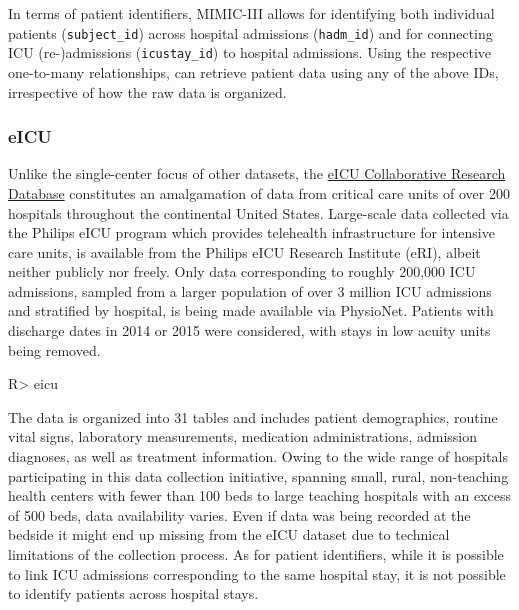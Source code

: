 \documentclass[
]{jss}
\begin{document}
In terms of patient identifiers, MIMIC-III allows for identifying both
individual patients (\texttt{subject\_id}) across hospital admissions
(\texttt{hadm\_id}) and for connecting ICU (re-)admissions
(\texttt{icustay\_id}) to hospital admissions. Using the respective
one-to-many relationships,  can retrieve patient data using
any of the above IDs, irrespective of how the raw data is organized.

\hypertarget{eicu}{%
\subsubsection{eICU}\label{eicu}}

Unlike the single-center focus of other datasets, the
\href{https://physionet.org/content/eicu-crd/2.0/}{eICU Collaborative
Research Database} constitutes an amalgamation of data from critical
care units of over 200 hospitals throughout the continental United
States. Large-scale data collected via the Philips eICU program which
provides telehealth infrastructure for intensive care units, is
available from the Philips eICU Research Institute (eRI), albeit neither
publicly nor freely. Only data corresponding to roughly 200,000 ICU
admissions, sampled from a larger population of over 3 million ICU
admissions and stratified by hospital, is being made available via
PhysioNet. Patients with discharge dates in 2014 or 2015 were
considered, with stays in low acuity units being removed.

\begin{CodeChunk}
\begin{CodeInput}
R> eicu
\end{CodeInput}
\end{CodeChunk}

The data is organized into 31 tables and includes patient demographics,
routine vital signs, laboratory measurements, medication
administrations, admission diagnoses, as well as treatment information.
Owing to the wide range of hospitals participating in this data
collection initiative, spanning small, rural, non-teaching health
centers with fewer than 100 beds to large teaching hospitals with an
excess of 500 beds, data availability varies. Even if data was being
recorded at the bedside it might end up missing from the eICU dataset
due to technical limitations of the collection process. As for patient
identifiers, while it is possible to link ICU admissions corresponding
to the same hospital stay, it is not possible to identify patients
across hospital stays.
\end{document}
